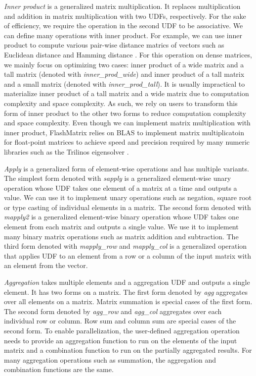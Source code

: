 \textit{Inner product} is a generalized matrix multiplication. It replaces
multiplication and addition in matrix multiplication with two UDFs,
respectively. For the sake of efficiency, we require the operation
in the second UDF to be associative. We can define many operations with inner
product. For example, we can use inner product to compute various pair-wise
distance matrics of vectors such as Euclidean distance \cite{euclidean} and
Hamming distance \cite{hamming}. For this operation on dense matrices, we
mainly focus on optimizing two cases: inner product of a wide matrix and
a tall matrix (denoted with \textit{inner\_prod\_wide}) and inner product of
a tall matrix and a small matrix (denoted with \textit{inner\_prod\_tall}).
It is usually impractical to materialize inner
product of a tall matrix and a wide matrix due to computation
complexity and space complexity. As such, we rely on users to transform this
form of inner product to the other two forms to reduce computation complexity
and space complexity.
Even though we can implement matrix multiplication with inner product,
FlashMatrix relies on BLAS to implement matrix multiplicatoin for
float-point matrices to achieve speed and precision required by
many numeric libraries such as the Trilinos eigensolver \cite{anasazi, FlashEigen}.

\textit{Apply} is a generalized form of element-wise operations and has
multiple variants. The simplest form denoted with \textit{sapply} is
a generalized element-wise unary operation whose UDF takes one element of
a matrix at a time and outputs a value. We can use it to implement unary
operations such as negation, square root or type casting of individual elements
in a matrix. The second form denoted with \textit{mapply2} is a generalized
element-wise binary operation whose UDF takes one element from each
matrix and outputs a single value. We use it to implement many binary
matrix operations such as matrix addition and subtraction. The third form
denoted with \textit{mapply\_row} and \textit{mapply\_col} is a generalized
operation that applies UDF to an element from a row or a column of the input
matrix with an element from the vector.

\textit{Aggregation} takes multiple elements and a aggregation UDF and outputs
a single element. It has two forms on a matrix.
The first form denoted by \textit{agg} aggregates over all elements on a matrix.
Matrix summation is special cases of the first form. The second form denoted by
\textit{agg\_row} and \textit{agg\_col} aggregates over each individual row
or column. Row sum and column sum are special cases of the second form.
To enable parallelization, the user-defined aggregation operation needs to
provide an aggregation function to run on the elements of the input matrix
and a combination function to run on the partially aggregated
results. For many aggregation operations such as summation, the aggregation
and combination functions are the same.

